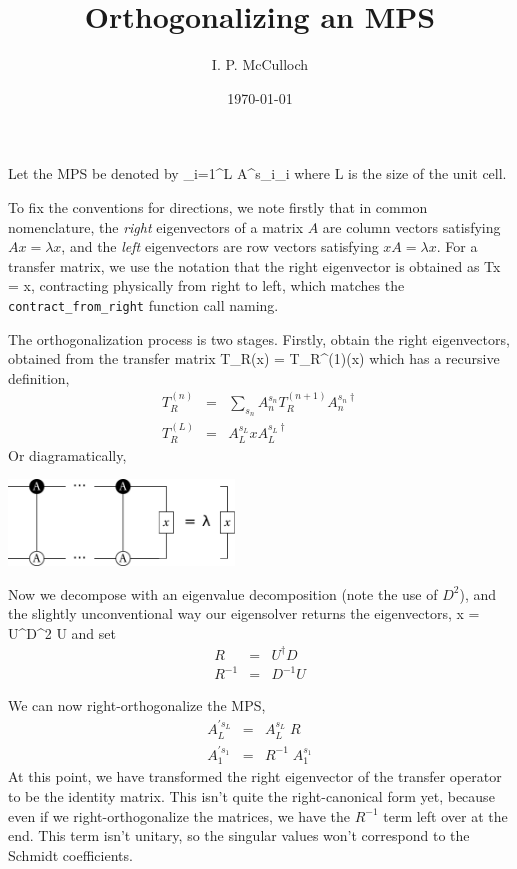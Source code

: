 \documentclass{article}[10pt]
\title{Orthogonalizing an MPS}
\author{I. P. McCulloch}
\date{\today}
\begin{document}
\maketitle

Let the MPS be denoted by
\beq
\prod_{i=1}^{L} A^{s_i}_{i}
\eeq
where L is the size of the unit cell.

To fix the conventions for directions, we note firstly that 
in common nomenclature, the \emph{right} eigenvectors of a matrix $A$ are column vectors satisfying
$Ax = \lambda x$, and the \emph{left} eigenvectors are row vectors satisfying $x A = \lambda x$.
For a transfer matrix, we use the notation that the right eigenvector is obtained as Tx = x, contracting
physically from right to left, which matches the \texttt{contract\_from\_right} function call naming.

The orthogonalization process is two stages.  Firstly, obtain the right eigenvectors, obtained from the transfer
matrix
\beq
T_R(x) = T_R^{(1)}(x)
\eeq
which has a recursive definition,
\begin{eqnarray}
T_R^{(n)} &=& \sum_{s_n}  A^{s_n}_n T_R^{(n+1)} A^{s_n\dagger}_n \\
T_R^{(L)} &=&  A^{s_L}_L x A^{s_L\dagger}_L
\end{eqnarray}
Or diagramatically,

\begin{centering}
\includegraphics[width=6cm]{TransferRight.pdf}\par
\end{centering}

Now we decompose with an eigenvalue decomposition (note the use of $D^2$),
and the slightly unconventional way our eigensolver returns the eigenvectors,
\beq
x = U^\dagger D^2 U
\eeq
and set
\begin{eqnarray}
R &=& U^\dagger D \\
R^{-1} &=& D^{-1} U
\end{eqnarray}

We can now right-orthogonalize the MPS,
\begin{eqnarray}
A^{'s_L}_L &=& A^{s_L}_L \; R \\
A^{'s_1}_1 &=& R^{-1} \; A^{s_1}_1
\end{eqnarray}
At this point, we have transformed the right eigenvector
of the transfer operator to be the identity matrix. This isn't quite the right-canonical form yet, because
even if we right-orthogonalize the matrices, we have the $R^{-1}$ term left over at the end. This term
isn't unitary, so the singular values won't correspond to the Schmidt coefficients. 
\end{document}
